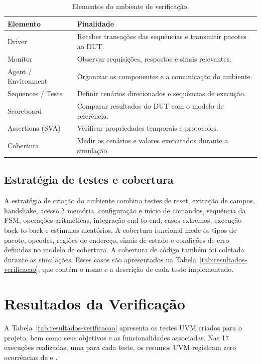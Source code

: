 \documentclass[10pt,a4paper]{article}
\newcommand{\signal}[1]{\texttt{\detokenize{#1}}}
\begin{document}
\begin{table}[H]
\centering
\caption{Elementos do ambiente de verificação.}
\label{tab:uvm}
\small
\begin{tabularx}{\textwidth}{lY}
\toprule
\textbf{Elemento} & \textbf{Finalidade}\\
\midrule
Driver & Receber transações das sequências e transmitir pacotes ao DUT.\\
Monitor & Observar requisições, respostas e sinais relevantes.\\
Agent / Environment & Organizar os componentes e a comunicação do ambiente.\\
Sequences / Tests & Definir cenários direcionados e sequências de execução.\\
Scoreboard & Comparar resultados do DUT com o modelo de referência.\\
Assertions (SVA) & Verificar propriedades temporais e protocolos.\\
Cobertura & Medir os cenários e valores exercitados durante a simulação.\\
\bottomrule
\end{tabularx}
\end{table}

\subsection{Estratégia de testes e cobertura}
A estratégia de criação do ambiente combina testes de reset, extração de campos, handshake, acesso
à memória, configuração e início de comandos, sequência da FSM, operações
aritméticas, integração end-to-end, casos extremos, execução back-to-back
e estímulos aleatórios. A cobertura funcional mede os tipos de pacote,
opcodes, regiões de endereço, sinais de estado e condições de erro
definidos no modelo de cobertura. A cobertura de código também foi
coletada durante as simulações. Esses casos são apresentados na
Tabela~\ref{tab:resultados-verificacao}, que contém o nome e a descrição
de cada teste implementado.

\section{Resultados da Verificação}

A Tabela~\ref{tab:resultados-verificacao} apresenta os testes UVM criados para o projeto, bem como seus objetivos e as funcionalidades associadas. Nas 17 execuções realizadas, uma para cada teste, os resumos UVM registram zero ocorrências de \signal{UVM_ERROR} e \signal{UVM_FATAL}.
\end{document}
